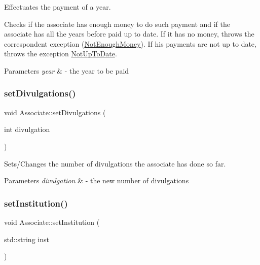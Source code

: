 Effectuates the payment of a year. 

Checks if the associate has enough money to do such payment and if the associate has all the years before paid up to date. If it has no money, throws the correspondent exception (\hyperlink{classNotEnoughMoney}{Not\+Enough\+Money}). If his payments are not up to date, throws the exception \hyperlink{classNotUpToDate}{Not\+Up\+To\+Date}.


\begin{DoxyParams}{Parameters}
{\em year} & -\/ the year to be paid \\
\hline
\end{DoxyParams}
\mbox{\label{classAssociate_a7c9f1c593da26eedc3a4f56302f67bec}} 
\subsubsection{\texorpdfstring{set\+Divulgations()}{setDivulgations()}}
{\footnotesize\ttfamily void Associate\+::set\+Divulgations (\begin{DoxyParamCaption}\item[{int}]{divulgation }\end{DoxyParamCaption})}



Sets/\+Changes the number of divulgations the associate has done so far. 


\begin{DoxyParams}{Parameters}
{\em divulgation} & -\/ the new number of divulgations \\
\hline
\end{DoxyParams}
\mbox{\label{classAssociate_aa441347cdbef813e4603d2c67e0822fb}} 
\subsubsection{\texorpdfstring{set\+Institution()}{setInstitution()}}
{\footnotesize\ttfamily void Associate\+::set\+Institution (\begin{DoxyParamCaption}\item[{std\+::string}]{inst }\end{DoxyParamCaption})}



